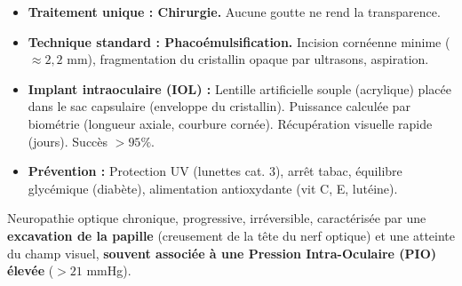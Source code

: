 \documentclass[11pt]{article}
\newcounter{popsec}
\newcounter{popsub}
\newcommand{\courssub}[1]{%
  \stepcounter{popsub}%
  \par\vspace{9pt}\noindent{\popxbold\fontsize{11.5}{13}\selectfont\color{popink}{\color{poporange}\thepopsec.\thepopsub}\hspace{6pt}#1}\par\nopagebreak\vspace{4pt}
}
\begin{document}
\begin{propriete}
\begin{itemize}
    \item \textbf{Traitement unique : Chirurgie.} Aucune goutte ne rend la transparence.
    \item \textbf{Technique standard : Phacoémulsification.} Incision cornéenne minime ($\approx 2,2$ mm), fragmentation du cristallin opaque par ultrasons, aspiration.
    \item \textbf{Implant intraoculaire (IOL) :} Lentille artificielle souple (acrylique) placée dans le sac capsulaire (enveloppe du cristallin). Puissance calculée par biométrie (longueur axiale, courbure cornée). Récupération visuelle rapide (jours). Succès $> 95\%$.
    \item \textbf{Prévention :} Protection UV (lunettes cat. 3), arrêt tabac, équilibre glycémique (diabète), alimentation antioxydante (vit C, E, lutéine).
\end{itemize}
\end{propriete}

\courssub{Le Glaucome}
\begin{definition}
Neuropathie optique chronique, progressive, irréversible, caractérisée par une \textbf{excavation de la papille} (creusement de la tête du nerf optique) et une atteinte du champ visuel, \textbf{souvent associée à une Pression Intra-Oculaire (PIO) élevée} ($> 21$ mmHg).
\end{definition}
\end{document}
